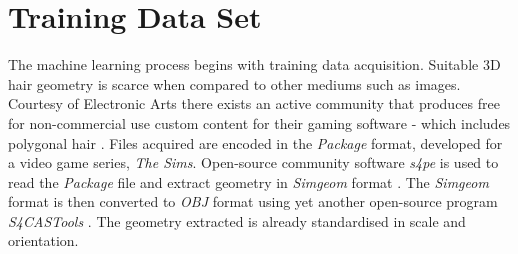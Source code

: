 \documentclass[ %
author={Dillon Keith Diep},
supervisor={Dr. Carl Henrik Ek},
degree={MEng},
title={ART-CG:},
subtitle={Assisted Real-time Content Generation of 3D Hair by Learning Manifolds},
type={Research},
year={2017} ]{dissertation}
\begin{document}
\section{Training Data Set}
The machine learning process begins with training data acquisition. Suitable 3D hair geometry is scarce when compared to other mediums such as images. Courtesy of Electronic Arts there exists an active community that produces free for non-commercial use custom content for their gaming software - which includes polygonal hair \cite{tsr}. Files acquired are encoded in the \textit{Package} format, developed for a video game series, \textit{The Sims}. Open-source community software \textit{s4pe} is used to read the \textit{Package} file and extract geometry in \textit{Simgeom} format \cite{s4pe}. The \textit{Simgeom} format is then converted to \textit{OBJ} format using yet another open-source program \textit{S4CASTools} \cite{s4cas}. The geometry extracted is already standardised in scale and orientation.
\end{document}
